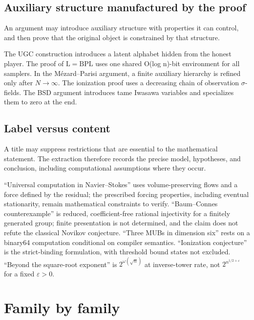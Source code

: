 \documentclass[11pt]{article}
\begin{document}
\subsection{\texorpdfstring{Auxiliary structure manufactured by the proof}{Auxiliary structure manufactured by the proof}}

An argument may introduce auxiliary structure with properties it can control, and then prove that the original object is constrained by that structure.

The UGC construction introduces a latent alphabet hidden from the honest player. The proof of $\mathrm{L}=\mathrm{BPL}$ uses one shared O(log n)-bit environment for all samplers. In the Mézard--Parisi argument, a finite auxiliary hierarchy is refined only after $N\to\infty$. The ionization proof uses a decreasing chain of observation $\sigma$-fields. The BSD argument introduces tame Iwasawa variables and specializes them to zero at the end.

\subsection{\texorpdfstring{Label versus content}{Label versus content}}

A title may suppress restrictions that are essential to the mathematical statement. The extraction therefore records the precise model, hypotheses, and conclusion, including computational assumptions where they occur.

``Universal computation in Navier--Stokes'' uses volume-preserving flows and a force defined by the residual; the prescribed forcing properties, including eventual stationarity, remain mathematical constraints to verify. ``Baum--Connes counterexample'' is reduced, coefficient-free rational injectivity for a finitely generated group; finite presentation is not determined, and the claim does not refute the classical Novikov conjecture. ``Three MUBs in dimension six'' rests on a binary64 computation conditional on compiler semantics. ``Ionization conjecture'' is the strict-binding formulation, with threshold bound states not excluded. ``Beyond the square-root exponent'' is $2^{\omega(\sqrt{n})}$ at inverse-tower rate, not $2^{n^{1/2+\varepsilon}}$ for a fixed $\varepsilon>0$.

\section{\texorpdfstring{Family by family}{Family by family}}\label{sec:cards}
\end{document}
